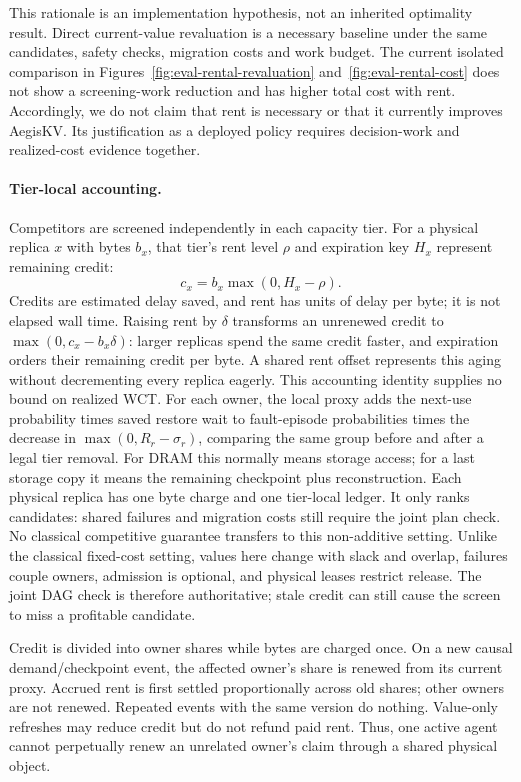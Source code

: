 This rationale is an implementation hypothesis, not an inherited
optimality result. Direct current-value revaluation is a necessary
baseline under the same candidates, safety checks, migration costs and
work budget. The current isolated comparison in
Figures~\ref{fig:eval-rental-revaluation} and~\ref{fig:eval-rental-cost}
does not show a screening-work reduction and has higher total cost with
rent. Accordingly, we do not claim that rent is necessary or that it
currently improves AegisKV. Its justification as a deployed policy
requires decision-work and realized-cost evidence together.

\paragraph{Tier-local accounting.}
Competitors are screened independently in each capacity tier. For a physical replica
$x$ with bytes $b_x$, that tier's rent level $\rho$ and expiration key
$H_x$ represent remaining credit:
\begin{equation}
 c_x=b_x\max(0,H_x-\rho).
 \label{eq:rent}
\end{equation}
Credits are estimated delay saved, and rent has units of delay per byte;
it is not elapsed wall time. Raising rent by $\delta$ transforms an
unrenewed credit to $\max(0,c_x-b_x\delta)$: larger replicas spend the
same credit faster, and expiration orders their remaining credit per
byte. A shared rent offset represents this aging without decrementing
every replica eagerly. This accounting identity supplies no bound on
realized WCT. For each owner, the local proxy adds the next-use probability times
saved restore wait to fault-episode probabilities times the decrease in
$\max(0,R_r-\sigma_r)$, comparing the same group before and after a legal tier removal.
For DRAM this normally means storage access; for a last storage copy it
means the remaining checkpoint plus reconstruction. Each physical replica
has one byte charge and one tier-local ledger.
It only ranks candidates:
shared failures and migration costs still require the joint plan check.
No classical competitive guarantee transfers to this non-additive setting.
Unlike the classical fixed-cost setting, values here change with slack
and overlap, failures couple owners, admission is optional, and physical
leases restrict release. The joint DAG check is therefore authoritative;
stale credit can still cause the screen to miss a profitable candidate.

Credit is divided into owner shares while bytes are charged once. On a
new causal demand/checkpoint event, the affected owner's share is renewed
from its current proxy. Accrued rent is first settled proportionally across
old shares; other owners are not renewed. Repeated events with the same
version do nothing. Value-only refreshes may reduce credit but do not
refund paid rent. Thus, one active agent cannot perpetually renew an
unrelated owner's claim through a shared physical object.

